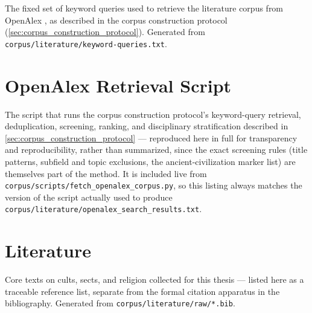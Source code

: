 The fixed set of keyword queries used to retrieve the literature corpus from
OpenAlex \autocite{priemOpenAlexFullyopenIndex2022}, as described in the
corpus construction protocol (\ref{sec:corpus_construction_protocol}).
Generated from \texttt{corpus/literature/keyword-queries.txt}.



\section{OpenAlex Retrieval Script}\label{sec:openalex_script}

The script that runs the corpus construction protocol's keyword-query
retrieval, deduplication, screening, ranking, and disciplinary stratification
described in \ref{sec:corpus_construction_protocol} — reproduced here in full
for transparency and reproducibility, rather than summarized, since the exact
screening rules (title patterns, subfield and topic exclusions, the
ancient-civilization marker list) are themselves part of the method. It is
included live from \texttt{corpus/scripts/fetch\_openalex\_corpus.py}, so this
listing always matches the version of the script actually used to produce
\texttt{corpus/literature/openalex\_search\_results.txt}.



\section{Literature}\label{sec:literature_bibliography}

Core texts on cults, sects, and religion collected for this thesis — listed
here as a traceable reference list, separate from the formal citation apparatus
in the bibliography. Generated from \texttt{corpus/literature/raw/*.bib}.



